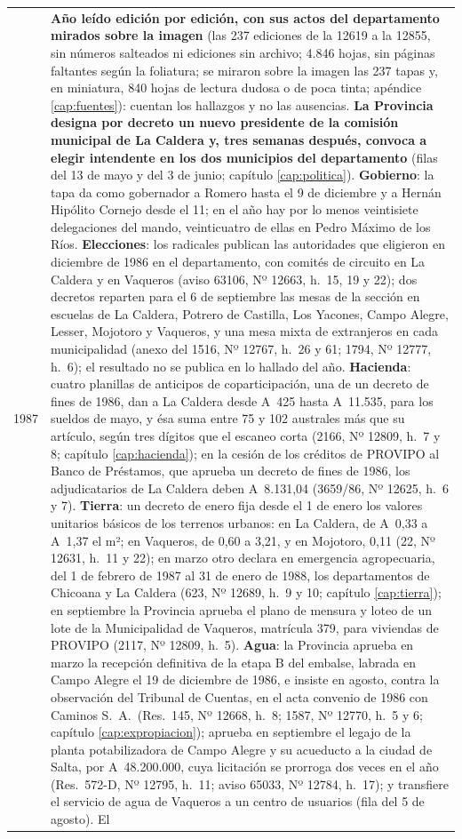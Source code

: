 \begin{longtable}{@{}p{2.7cm}p{10.3cm}@{}}
1987 & \textbf{Año leído edición por edición, con sus actos del departamento mirados sobre la imagen} (las 237 ediciones de la 12619 a la 12855, sin números salteados ni ediciones sin archivo; 4.846 hojas, sin páginas faltantes según la foliatura; se miraron sobre la imagen las 237 tapas y, en miniatura, 840 hojas de lectura dudosa o de poca tinta; apéndice \ref{cap:fuentes}): cuentan los hallazgos y no las ausencias. \textbf{La Provincia designa por decreto un nuevo presidente de la comisión municipal de La Caldera y, tres semanas después, convoca a elegir intendente en los dos municipios del departamento} (filas del 13 de mayo y del 3 de junio; capítulo \ref{cap:politica}). \textbf{Gobierno}: la tapa da como gobernador a Romero hasta el 9 de diciembre y a Hernán Hipólito Cornejo desde el 11; en el año hay por lo menos veintisiete delegaciones del mando, veinticuatro de ellas en Pedro Máximo de los Ríos. \textbf{Elecciones}: los radicales publican las autoridades que eligieron en diciembre de 1986 en el departamento, con comités de circuito en La Caldera y en Vaqueros (aviso 63106, Nº 12663, h.\ 15, 19 y 22); dos decretos reparten para el 6 de septiembre las mesas de la sección en escuelas de La Caldera, Potrero de Castilla, Los Yacones, Campo Alegre, Lesser, Mojotoro y Vaqueros, y una mesa mixta de extranjeros en cada municipalidad (anexo del 1516, Nº 12767, h.\ 26 y 61; 1794, Nº 12777, h.\ 6); el resultado no se publica en lo hallado del año. \textbf{Hacienda}: cuatro planillas de anticipos de coparticipación, una de un decreto de fines de 1986, dan a La Caldera desde A~425 hasta A~11.535, para los sueldos de mayo, y ésa suma entre 75 y 102 australes más que su artículo, según tres dígitos que el escaneo corta (2166, Nº 12809, h.\ 7 y 8; capítulo \ref{cap:hacienda}); en la cesión de los créditos de PROVIPO al Banco de Préstamos, que aprueba un decreto de fines de 1986, los adjudicatarios de La Caldera deben A~8.131,04 (3659/86, Nº 12625, h.\ 6 y 7). \textbf{Tierra}: un decreto de enero fija desde el 1 de enero los valores unitarios básicos de los terrenos urbanos: en La Caldera, de A~0,33 a A~1,37 el m²; en Vaqueros, de 0,60 a 3,21, y en Mojotoro, 0,11 (22, Nº 12631, h.\ 11 y 22); en marzo otro declara en emergencia agropecuaria, del 1 de febrero de 1987 al 31 de enero de 1988, los departamentos de Chicoana y La Caldera (623, Nº 12689, h.\ 9 y 10; capítulo \ref{cap:tierra}); en septiembre la Provincia aprueba el plano de mensura y loteo de un lote de la Municipalidad de Vaqueros, matrícula 379, para viviendas de PROVIPO (2117, Nº 12809, h.\ 5). \textbf{Agua}: la Provincia aprueba en marzo la recepción definitiva de la etapa B del embalse, labrada en Campo Alegre el 19 de diciembre de 1986, e insiste en agosto, contra la observación del Tribunal de Cuentas, en el acta convenio de 1986 con Caminos S.\ A.\ (Res.\ 145, Nº 12668, h.\ 8; 1587, Nº 12770, h.\ 5 y 6; capítulo \ref{cap:expropiacion}); aprueba en septiembre el legajo de la planta potabilizadora de Campo Alegre y su acueducto a la ciudad de Salta, por A~48.200.000, cuya licitación se prorroga dos veces en el año (Res.\ 572-D, Nº 12795, h.\ 11; aviso 65033, Nº 12784, h.\ 17); y transfiere el servicio de agua de Vaqueros a un centro de usuarios (fila del 5 de agosto). El 
\end{longtable}
